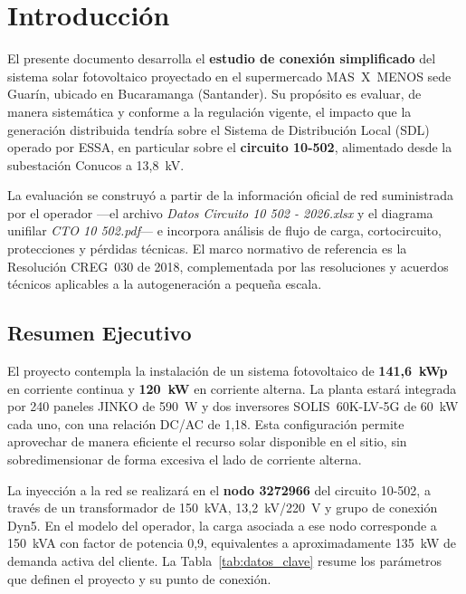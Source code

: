 \chapter{Introducción}

El presente documento desarrolla el \textbf{estudio de conexión simplificado} del sistema solar fotovoltaico proyectado en el supermercado MAS~X~MENOS sede Guarín, ubicado en Bucaramanga (Santander). Su propósito es evaluar, de manera sistemática y conforme a la regulación vigente, el impacto que la generación distribuida tendría sobre el Sistema de Distribución Local (SDL) operado por ESSA, en particular sobre el \textbf{circuito 10-502}, alimentado desde la subestación Conucos a 13,8~kV.

La evaluación se construyó a partir de la información oficial de red suministrada por el operador ---el archivo \textit{Datos Circuito 10 502 - 2026.xlsx} y el diagrama unifilar \textit{CTO 10 502.pdf}--- e incorpora análisis de flujo de carga, cortocircuito, protecciones y pérdidas técnicas. El marco normativo de referencia es la Resolución CREG~030 de 2018, complementada por las resoluciones y acuerdos técnicos aplicables a la autogeneración a pequeña escala.

\section{Resumen Ejecutivo}

El proyecto contempla la instalación de un sistema fotovoltaico de \textbf{141,6~kWp} en corriente continua y \textbf{120~kW} en corriente alterna. La planta estará integrada por 240 paneles JINKO de 590~W y dos inversores SOLIS~60K-LV-5G de 60~kW cada uno, con una relación DC/AC de 1,18. Esta configuración permite aprovechar de manera eficiente el recurso solar disponible en el sitio, sin sobredimensionar de forma excesiva el lado de corriente alterna.

La inyección a la red se realizará en el \textbf{nodo 3272966} del circuito 10-502, a través de un transformador de 150~kVA, 13,2~kV/220~V y grupo de conexión Dyn5. En el modelo del operador, la carga asociada a ese nodo corresponde a 150~kVA con factor de potencia 0,9, equivalentes a aproximadamente 135~kW de demanda activa del cliente. La Tabla~\ref{tab:datos_clave} resume los parámetros que definen el proyecto y su punto de conexión.

